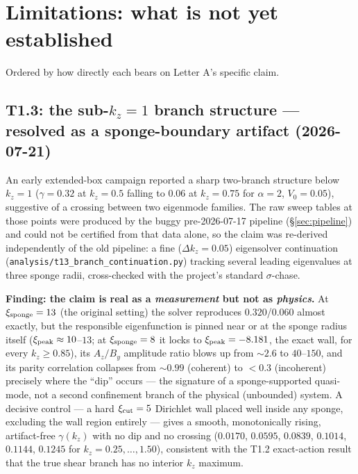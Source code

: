 \documentclass[11pt,a4paper]{article}
\numberwithin{equation}{section}
\theoremstyle{remark}
\newcommand{\Vo}{V_0}
\newcommand{\kz}{k_z}
\begin{document}
\section{Limitations: what is not yet established}
\label{sec:limitations}

Ordered by how directly each bears on Letter A's specific claim.

\subsection{T1.3: the sub-$\kz=1$ branch structure --- resolved as a
sponge-boundary artifact (2026-07-21)}

An early extended-box campaign reported a sharp two-branch structure
below $\kz=1$ ($\gamma=0.32$ at $\kz=0.5$ falling to $0.06$ at $\kz=0.75$
for $\alpha=2$, $\Vo=0.05$), suggestive of a crossing between two
eigenmode families. The raw sweep tables at those points were produced by
the buggy pre-2026-07-17 pipeline (\S\ref{sec:pipeline}) and could not be
certified from that data alone, so the claim was re-derived independently
of the old pipeline: a fine (\(\Delta\kz=0.05\)) eigensolver continuation
(\texttt{analysis/t13\_branch\_continuation.py}) tracking several leading
eigenvalues at three sponge radii, cross-checked with the project's
standard $\sigma$-chase.

\textbf{Finding: the claim is real as a \emph{measurement} but not as
\emph{physics}.} At $\xi_{\rm sponge}=13$ (the original setting) the
solver reproduces $0.320$/$0.060$ almost exactly, but the responsible
eigenfunction is pinned near or at the sponge radius itself
($\xi_{\rm peak}\approx10$--$13$; at $\xi_{\rm sponge}=8$ it locks to
$\xi_{\rm peak}=-8.181$, the exact wall, for every $\kz\ge0.85$), its
$A_z/B_y$ amplitude ratio blows up from $\sim\!2.6$ to $40$--$150$, and its
parity correlation collapses from $\sim\!0.99$ (coherent) to $<0.3$
(incoherent) precisely where the ``dip'' occurs --- the signature of a
sponge-supported quasi-mode, not a second confinement branch of the
physical (unbounded) system. A decisive control --- a hard $\xi_{\rm
cut}=5$ Dirichlet wall placed well inside any sponge, excluding the wall
region entirely --- gives a smooth, monotonically rising, artifact-free
$\gamma(\kz)$ with no dip and no crossing (\(0.0170\), \(0.0595\),
\(0.0839\), \(0.1014\), \(0.1144\), \(0.1245\) for
$\kz=0.25,\ldots,1.50$), consistent with the T1.2 exact-action result
that the true shear branch has no interior $\kz$ maximum.
\end{document}
